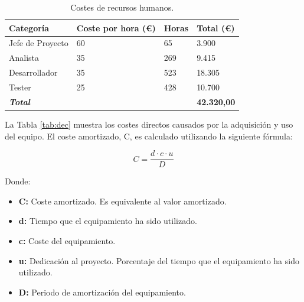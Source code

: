 \begin{center}
\begin{table}[htbp]
\centering
\caption{Costes de recursos humanos.}
\begin{tabular}{@{}p{3cm} R{3.5cm} R{2.2cm} R{2.4cm}@{}} 
\toprule
\textbf{Categoría} & \textbf{Coste por hora (\euro)} & \textbf{Horas} & \textbf{Total (\euro)} \\
\midrule
Jefe de Proyecto					& 60 						& 65			& 3.900 \\
Analista			 				& 35							& 269		& 9.415 \\
Desarrollador		 				& 35							& 523		& 18.305 \\
Tester		 					& 25							& 428		& 10.700 \\
\midrule
\textbf{\textit{Total}}			&							&			& \textbf{42.320,00}\\
\bottomrule
\end{tabular}
\label{tab:dhrc}
\end{table}
\end{center}

La Tabla \ref{tab:dec} muestra los costes directos causados por la adquisición y uso del equipo. El coste amortizado, C, es calculado utilizando la siguiente fórmula:

\begin{equation}
  C = \frac{d \cdot c \cdot u}{D}
\label{eq:costs}
\end{equation}

Donde:

\begin{itemize}

\item \textbf{C:} Coste amortizado. Es equivalente al valor amortizado.

\item \textbf{d:} Tiempo que el equipamiento ha sido utilizado.

\item \textbf{c:} Coste del equipamiento. 

\item \textbf{u:} Dedicación al proyecto. Porcentaje del tiempo que el equipamiento ha sido utilizado.

\item \textbf{D:} Periodo de amortización del equipamiento.

\end{itemize}

